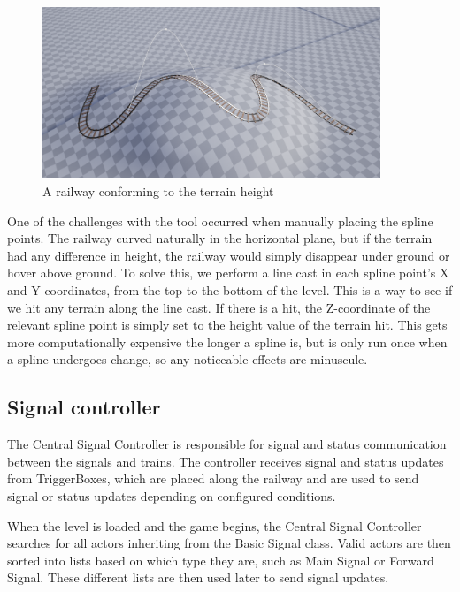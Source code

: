 \begin{figure}[h]
    \centerline{\includegraphics[width=0.9\textwidth]{figures/Spline2.png}}
    \caption[size=small]{A railway conforming to the terrain height}
\end{figure} 

One of the challenges with the tool occurred when manually placing the spline points. The railway curved naturally in the horizontal plane, but if the terrain had any difference in height, the railway would simply disappear under ground or hover above ground. To solve this, we perform a line cast in each spline point's X and Y coordinates, from the top to the bottom of the level. This is a way to see if we hit any terrain along the line cast. If there is a hit, the Z-coordinate of the relevant spline point is simply set to the height value of the terrain hit. This gets more computationally expensive the longer a spline is, but is only run once when a spline undergoes change, so any noticeable effects are minuscule. 

\subsection{Signal controller}

The Central Signal Controller is responsible for signal and status communication between the signals and trains. The controller receives signal and status updates from TriggerBoxes, which are placed along the railway and are used to send signal or status updates depending on configured conditions. 

When the level is loaded and the game begins, the Central Signal Controller searches for all actors inheriting from the Basic Signal class. Valid actors are then sorted into lists based on which type they are, such as Main Signal or Forward Signal. These different lists are then used later to send signal updates. 

